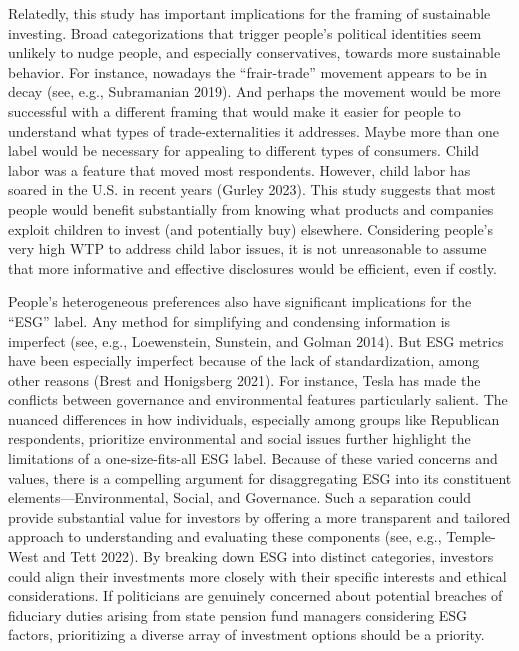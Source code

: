 \documentclass[
  12pt,
]{article}
\begin{document}
Relatedly, this study has important implications for the framing of sustainable investing. Broad categorizations that trigger people's political identities seem unlikely to nudge people, and especially conservatives, towards more sustainable behavior. For instance, nowadays the ``frair-trade'' movement appears to be in decay (see, e.g., Subramanian 2019). And perhaps the movement would be more successful with a different framing that would make it easier for people to understand what types of trade-externalities it addresses. Maybe more than one label would be necessary for appealing to different types of consumers. Child labor was a feature that moved most respondents. However, child labor has soared in the U.S. in recent years (Gurley 2023). This study suggests that most people would benefit substantially from knowing what products and companies exploit children to invest (and potentially buy) elsewhere. Considering people's very high WTP to address child labor issues, it is not unreasonable to assume that more informative and effective disclosures would be efficient, even if costly.

People's heterogeneous preferences also have significant implications for the ``ESG'' label. Any method for simplifying and condensing information is imperfect (see, e.g., Loewenstein, Sunstein, and Golman 2014). But ESG metrics have been especially imperfect because of the lack of standardization, among other reasons (Brest and Honigsberg 2021). For instance, Tesla has made the conflicts between governance and environmental features particularly salient. The nuanced differences in how individuals, especially among groups like Republican respondents, prioritize environmental and social issues further highlight the limitations of a one-size-fits-all ESG label. Because of these varied concerns and values, there is a compelling argument for disaggregating ESG into its constituent elements---Environmental, Social, and Governance. Such a separation could provide substantial value for investors by offering a more transparent and tailored approach to understanding and evaluating these components (see, e.g., Temple-West and Tett 2022). By breaking down ESG into distinct categories, investors could align their investments more closely with their specific interests and ethical considerations. If politicians are genuinely concerned about potential breaches of fiduciary duties arising from state pension fund managers considering ESG factors, prioritizing a diverse array of investment options should be a priority.
\end{document}
